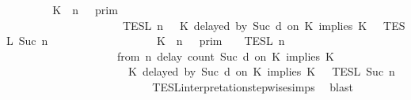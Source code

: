 \begin{isabellebody}
\ \ \isamarkupfalse%
\ \isamarkupfalse%
\ {\isacartoucheopen}{\isachardot}{\isachardot}{\isachardot}\ {\isacharequal}\ {\isacharparenleft}{\isasymlbrakk}{\isasymlbrakk}\ {\isacharparenleft}K\ {\isasymnot}{\isasymUp}\ n{\isacharparenright}\ {\isacharhash}\ {\isasymGamma}\ {\isasymrbrakk}{\isasymrbrakk}\isactrlsub p\isactrlsub r\isactrlsub i\isactrlsub m\ \isanewline
\ \ \ \ \ \ \ \ \ \ \ \ \ \ \ \ \ \ {\isasyminter}\ {\isasymlbrakk}{\isasymlbrakk}\ {\isasymPsi}\ {\isasymrbrakk}{\isasymrbrakk}\isactrlsub T\isactrlsub E\isactrlsub S\isactrlsub L\isactrlbsup {\isasymge}\ n\isactrlesup \ {\isasyminter}\ {\isasymlbrakk}{\isasymlbrakk}\ {\isacharparenleft}K\ delayed\ by\ {\isacharparenleft}Suc\ d{\isacharparenright}\ on\ K\ implies\ K\ {\isacharhash}\ {\isasymPhi}\ {\isasymrbrakk}{\isasymrbrakk}\isactrlsub T\isactrlsub E\isactrlsub S\isactrlsub L\isactrlbsup {\isasymge}\ Suc\ n\isactrlesup {\isacharparenright}\isanewline
\ \ \ \ \ \ \ \ \ \ \ \ \ \ \ \ \ {\isasymunion}\ {\isacharparenleft}{\isasymlbrakk}{\isasymlbrakk}\ {\isacharparenleft}K\ {\isasymUp}\ n{\isacharparenright}\ {\isacharhash}\ {\isasymGamma}\ {\isasymrbrakk}{\isasymrbrakk}\isactrlsub p\isactrlsub r\isactrlsub i\isactrlsub m\ {\isasyminter}\ {\isasymlbrakk}{\isasymlbrakk}\ {\isasymPsi}\ {\isasymrbrakk}{\isasymrbrakk}\isactrlsub T\isactrlsub E\isactrlsub S\isactrlsub L\isactrlbsup {\isasymge}\ n\isactrlesup \isanewline
\ \ \ \ \ \ \ \ \ \ \ \ \ \ \ \ \ \ {\isasyminter}\ {\isasymlbrakk}{\isasymlbrakk}\ {\isacharparenleft}from\ n\ delay\ count\ {\isacharparenleft}Suc\ d{\isacharparenright}\ on\ K\ implies\ K\isanewline
\ \ \ \ \ \ \ \ \ \ \ \ \ \ \ \ \ \ \ \ \ {\isacharhash}\ {\isacharparenleft}K\ delayed\ by\ {\isacharparenleft}Suc\ d{\isacharparenright}\ on\ K\ implies\ K\ {\isacharhash}\ {\isasymPhi}\ {\isasymrbrakk}{\isasymrbrakk}\isactrlsub T\isactrlsub E\isactrlsub S\isactrlsub L\isactrlbsup {\isasymge}\ Suc\ n\isactrlesup \isanewline
\ \ \ \ \ \ \ \ \ \ \ \ \ \ \ \ \ \ \ \ {\isacharparenright}{\isacartoucheclose}\isanewline
\ \ \ \ \isamarkupfalse%
\ TESL{\isacharunderscore}interpretation{\isacharunderscore}stepwise{\isachardot}simps{\isacharparenleft}{}{\isacharparenright}\ \isamarkupfalse%
\ blast\isanewline

\end{isabellebody}
